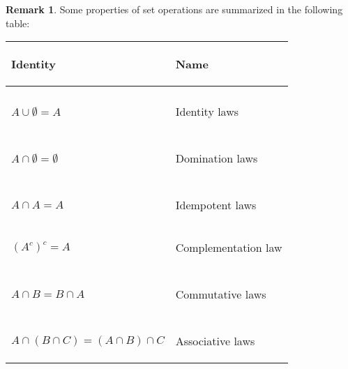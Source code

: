 \documentclass[12pt,letterpaper]{book}
\numberwithin{equation}{section}
\theoremstyle{definition}
\newtheorem{remark}[thm]{\textbf{Remark}}
\begin{document}
\begin{remark} Some properties of set operations are summarized in the following table:
\begin{center}
\begin{tabular}{|m{7cm}||m{5cm}|} \hline
\begin{center} Identity \end{center} & \begin{center}Name\end{center}\\
\hline\hline
\begin{center}  $A\cap U=A$ \\ $A\cup \emptyset=A$   \end{center} & \begin{center}   Identity laws  \end{center}  \\
\hline
\begin{center}   $A\cup U=U$ \\ $A\cap \emptyset=\emptyset$  \end{center} & \begin{center} Domination laws  \end{center}  \\
\hline
\begin{center}  $A\cup A=A$ \\ $A\cap A=A$   \end{center} & \begin{center} Idempotent laws  \end{center}  \\
\hline
\begin{center}  $(A^c)^c = A$ \end{center} & \begin{center} Complementation law  \end{center}  \\
\hline
\begin{center}  $A \cup B =B\cup A$ \\ $A\cap B=B\cap A$   \end{center} & \begin{center} Commutative laws\index{Commutative laws}  \end{center}  \\
\hline
\begin{center}  $A\cup (B\cup C)=(A\cup B)\cup C$ \\ $A\cap (B\cap C)=(A\cap B)\cap C$ \end{center} & \begin{center} Associative laws\index{Associative laws}  \end{center}  \\

\end{tabular}
\end{center}
\end{remark}
\end{document}
